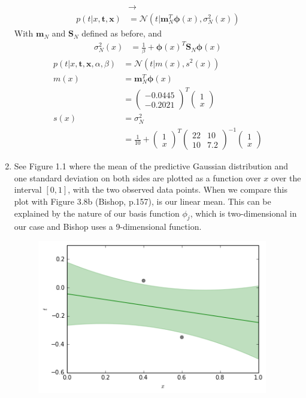 \documentclass[a4paper,10pt]{article}
\numberwithin{equation}{section} %
\numberwithin{figure}{section} %
\numberwithin{table}{section} %
\theoremstyle{mytheor}
\begin{document}
\begin{enumerate}
\begin{align}
		&\rightarrow\\
		p(t | x, \boldsymbol{t}, \boldsymbol{x}) &= \mathcal{N}(t | \boldsymbol{m}_N^T \boldsymbol{\phi}(x), \sigma_N^2(x))
		\end{align}
		With $\boldsymbol{m}_N$ and $\boldsymbol{S}_N$ defined as before, and
		\begin{align}
		\sigma_N^2(x) &= \frac{1}{\beta} + \boldsymbol{\phi}(x)^T\boldsymbol{S}_N\boldsymbol{\phi}(x)
		\end{align}
		\begin{align}
		p(t | x, \boldsymbol{t},\boldsymbol{x}, \alpha, \beta) &= \mathcal{N}(t | m(x), s^2(x))\\
		m(x) &= \boldsymbol{m}_N^T \boldsymbol{\phi}(x)\\
		&= \begin{pmatrix} -0.0445 \\ -0.2021 \end{pmatrix}^T \begin{pmatrix} 1 \\ x \end{pmatrix}\\
		s(x) &= \sigma_N^2\\
		&= \frac{1}{10} + \begin{pmatrix} 1 \\ x \end{pmatrix}^T \begin{pmatrix} 22 & 10 \\ 10 & 7.2 \end{pmatrix}^{-1} \begin{pmatrix} 1 \\ x \end{pmatrix}
		\end{align}
	\item See Figure 1.1 where the mean of the predictive Gaussian distribution and one standard deviation on both sides are plotted as a function over $x$ over the interval $[0,1]$, with the two observed data points. When we compare this plot with Figure 3.8b (Bishop, p.157), is our linear mean. This can be explained by the nature of our basis function $\phi_j$, which is two-dimensional in our case and Bishop uses a 9-dimensional function.
		\begin{figure}[h]
   			\centering
   			\includegraphics[width=0.95\textwidth]{exercise1plottanopink.png}\vspace{-0.4cm}

\end{figure}
\end{enumerate}
\end{document}
